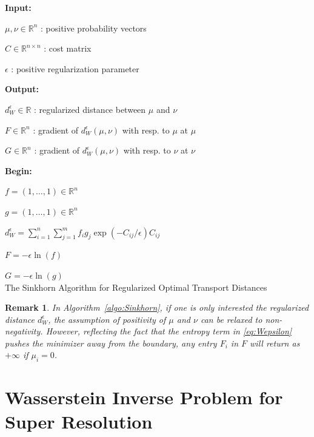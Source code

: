 \documentclass[conference]{IEEEtran}
\newcommand{\R}{{\mathbb{R}}}
\newtheorem*{remark}{Remark}
\begin{document}
\begin{algorithm}
    \textbf{Input:} 
    
    \quad $\mu, \nu \in \R^n$ : positive probability vectors 

    \quad $C\in\R^{n \times n}$ : cost matrix 
    
    \quad $\epsilon$ : positive regularization parameter
    
    \textbf{Output:}
    
    \quad $d_W^\epsilon \in \R$ : regularized distance between $\mu$ and $\nu$
    
    \quad $F \in \R^n$ : gradient of $d_W^\epsilon(\mu,\nu)$ with resp. to $\mu$ at $\mu$
    
    \quad $G \in \R^n$ : gradient of $d_W^\epsilon(\mu,\nu)$ with resp. to $\nu$ at $\nu$ 

    \textbf{Begin:} 

    $f = (1,\ldots,1)\in \R^n$
    
    $g = (1,\ldots,1)\in \R^n$
    
 	{
  	}
  	
    $d_W^\epsilon = \sum_{i=1}^n \sum_{j=1}^m f_i g_j \exp(-C_{ij} /\epsilon) C_{ij}$ 
  	
  	$F = -\epsilon \ln(f)$
  	
  	$G = -\epsilon \ln(g)$\\
  	
	\caption{The Sinkhorn Algorithm for Regularized Optimal Transport Distances}
	\label{algo:Sinkhorn}
\end{algorithm}


\begin{remark}
In Algorithm~\ref{algo:Sinkhorn}, if one is only interested the regularized distance $d_W^\epsilon$, the assumption of positivity of $\mu$ and $\nu$ can be relaxed to non-negativity. 
However, reflecting the fact that the entropy term in \eqref{eq:Wepsilon} pushes the minimizer away from the boundary, any entry $F_i$ in $F$ will return as $+\infty$ if $\mu_i=0$. 
\end{remark}

\section{Wasserstein Inverse Problem for Super Resolution}
\end{document}
